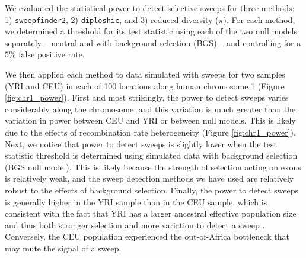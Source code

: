 \documentclass[hidelinks]{article}
\newcommand{\sweepfinder}{\texttt{sweepfinder2}\xspace}
\newcommand{\diploshic}{\texttt{diploshic}\xspace}
\begin{document}
    We evaluated the statistical power to detect selective sweeps for three methods:
    1) \sweepfinder \citep{degiorgio2016sweepfinder2},
    2) \diploshic \citep{kern2018diplos},
    and 3) reduced diversity ($\pi$).
    For each method, we determined a threshold for its test statistic 
    using each of the two null models separately -- neutral and with background selection (BGS)
    -- and controlling for a $5\%$ false positive rate.

    We then applied each method to data simulated with sweeps for two samples (YRI and CEU)
    in each of 100 locations along human chromosome 1 (Figure \ref{fig:chr1_power}).
    First and most strikingly, the power to detect sweeps varies considerably along the chromosome,
    and this variation is much greater than the variation in power between CEU and YRI or between
    null models. This is likely due to the effects of recombination rate heterogeneity (Figure \ref{fig:chr1_power}).
    Next, we notice that power to detect sweeps is slightly lower when the test statistic threshold
    is determined using simulated data with background selection (BGS null model).
    This is likely because the strength of selection acting on exons is relatively weak, and the
    sweep detection methods we have used are relatively robust to the effects of background selection. 
    Finally, the power to detect sweeps is generally higher in the YRI sample
    than in the CEU sample, which is consistent with the fact that YRI has a larger ancestral effective population size and
    thus both stronger selection and more variation to detect a sweep \citep[e.g.,][]{simonsen1995properties}.
    Conversely, the CEU population experienced the out-of-Africa bottleneck that may mute the signal of a sweep.  
\end{document}
